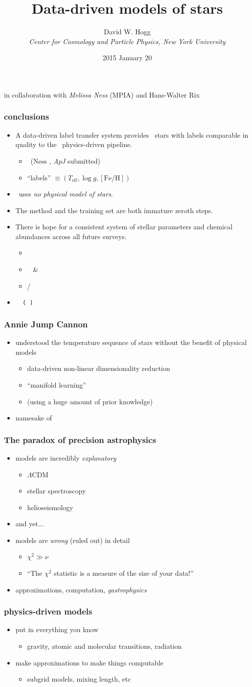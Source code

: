 \documentclass[pdftex]{beamer}
\title{Data-driven models of stars}
\author[David W. Hogg (NYU)]{David W. Hogg \\
  \textsl{\small Center for Cosmology and Particle Physics,
                 New York University}}
\date{2015 January 20}
\newcommand{\teff}{T_{\mathrm{eff}}}
\newcommand{\logg}{\log g}
\newcommand{\feh}{[\mathrm{Fe / H}]}
\newcommand{\conclusions}{%
\begin{frame}
  \frametitle{conclusions}
  \begin{itemize}
  \item A data-driven label transfer system provides \apogee\ stars with labels comparable in quality to the \apogee\ physics-driven pipeline.
    \begin{itemize}
    \item \tc\ (Ness \etal, \textit{ApJ} submitted)
    \item ``labels'' $\equiv (\teff,\logg,\feh)$
    \end{itemize}
  \item \tc\ uses \emph{no physical model of stars}.
  \item The method and the training set are both immature zeroth steps.
  \item There is hope for a consistent system of stellar parameters and chemical abundances across all future surveys.
    \begin{itemize}
    \item \gaia
    \item \sdss\ \project{SEGUE} \& \apogee
    \item \project{HERMES} / \project{GALAH}
    \end{itemize}
  \item \texttt{\giturl~~(\githash~\gitdate)}
  \end{itemize}
\end{frame}}
\begin{document}
\begin{frame}
  \titlepage
  in collaboration with \emph{Melissa Ness} (MPIA) and Hans-Walter Rix
\end{frame}

\conclusions

\begin{frame}
  \frametitle{Annie Jump Cannon}
  \begin{itemize}
  \item understood the temperature sequence of stars without the benefit of physical models
    \begin{itemize}
    \item data-driven non-linear dimensionality reduction
    \item ``manifold learning''
    \item (using a huge amount of prior knowledge)
    \end{itemize}
  \item namesake of \tc
  \end{itemize}
\end{frame}

\begin{frame}
  \frametitle{The paradox of precision astrophysics}
  \begin{itemize}
  \item models are incredibly \emph{explanatory}
    \begin{itemize}
    \item $\Lambda$CDM
    \item stellar spectroscopy
    \item helioseismology
    \end{itemize}
  \item and yet...
  \item<2-> models are \emph{wrong} (ruled out) in detail
    \begin{itemize}
    \item $\chi^2 \gg \nu$
    \item ``The $\chi^2$ statistic is a measure of the size of your data!''
    \end{itemize}
  \item<2-> approximations, computation, \emph{gastrophysics}
  \end{itemize}
\end{frame}

\begin{frame}
  \frametitle{physics-driven models}
  \begin{itemize}
  \item put in everything you know
    \begin{itemize}
    \item gravity, atomic and molecular transitions, radiation
    \end{itemize}
  \item make approximations to make things computable
    \begin{itemize}
    \item subgrid models, mixing length, etc
    \end{itemize}
  \end{itemize}
\end{frame}
\end{document}
